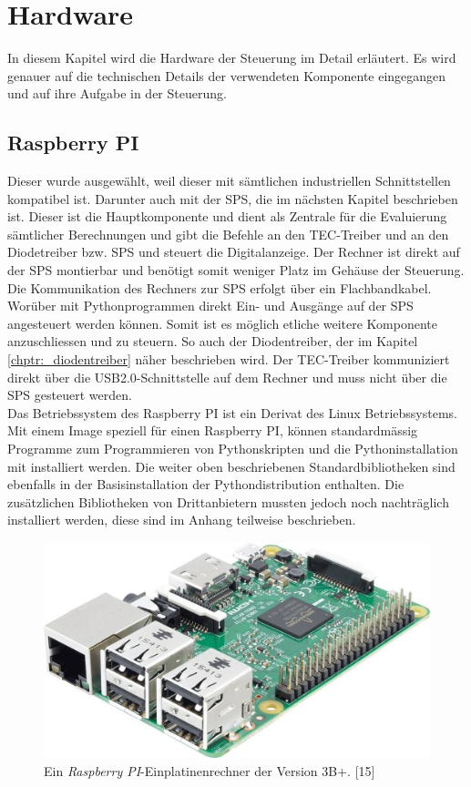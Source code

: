 \section{Hardware}
\label{chptr:hardware}
In diesem Kapitel wird die Hardware der Steuerung im Detail erläutert. Es wird genauer auf die technischen Details der verwendeten Komponente eingegangen und auf ihre Aufgabe in der Steuerung.

\subsection{Raspberry PI}
Dieser wurde ausgewählt, weil dieser mit sämtlichen industriellen Schnittstellen kompatibel ist. Darunter auch mit der SPS, die im nächsten Kapitel beschrieben ist. Dieser ist die Hauptkomponente und dient als Zentrale für die Evaluierung sämtlicher Berechnungen und gibt die Befehle an den TEC-Treiber und an den Diodetreiber bzw. SPS und steuert die Digitalanzeige. Der Rechner ist direkt auf der SPS montierbar und benötigt somit weniger Platz im Gehäuse der Steuerung. Die Kommunikation des Rechners zur SPS erfolgt über ein Flachbandkabel. Worüber mit Pythonprogrammen direkt Ein- und Ausgänge auf der SPS angesteuert werden können. Somit ist es möglich etliche weitere Komponente anzuschliessen und zu steuern. So auch der Diodentreiber, der im Kapitel \ref{chptr:_diodentreiber} näher beschrieben wird. Der TEC-Treiber kommuniziert direkt über die USB2.0-Schnittstelle auf dem Rechner und muss nicht über die SPS gesteuert werden.\\
Das Betriebssystem des Raspberry PI ist ein Derivat des Linux Betriebssystems. Mit einem Image speziell für einen Raspberry PI, können standardmässig Programme zum Programmieren von Pythonskripten und die Pythoninstallation mit installiert werden. Die weiter oben beschriebenen Standardbibliotheken sind ebenfalls in der Basisinstallation der Pythondistribution enthalten. Die zusätzlichen Bibliotheken von Drittanbietern mussten jedoch noch nachträglich installiert werden, diese sind im Anhang teilweise beschrieben.

\begin{figure}[H]
    \centering
    \includegraphics[scale=0.25]{98_images/raspberry_pi_version_3_b.jpg}
    \caption{Ein \textit{Raspberry PI}-Einplatinenrechner der Version  3B+. [15]}
    \label{fig:raspberry_pi_3b+}
\end{figure}

